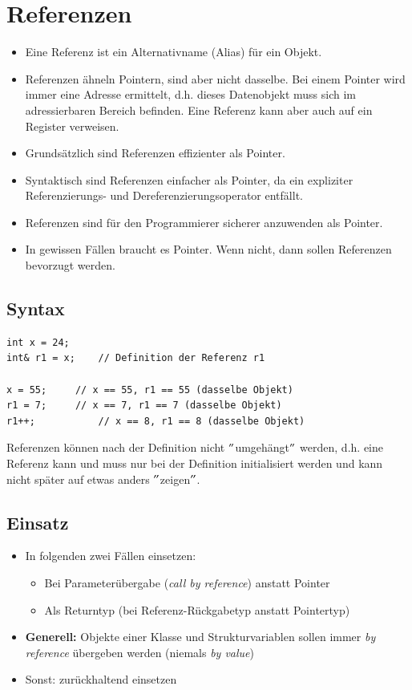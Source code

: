 \section{Referenzen}
\begin{itemize}
	\item Eine Referenz ist ein Alternativname (Alias) für ein Objekt.
	\item Referenzen ähneln Pointern, sind aber nicht dasselbe. Bei einem Pointer wird immer eine Adresse ermittelt, d.h. dieses Datenobjekt muss sich im adressierbaren Bereich befinden. Eine Referenz kann aber auch auf ein Register verweisen.
	\item Grundsätzlich sind Referenzen effizienter als Pointer.
	\item Syntaktisch sind Referenzen einfacher als Pointer, da ein expliziter Referenzierungs- und Dereferenzierungsoperator entfällt.
	\item Referenzen sind für den Programmierer sicherer anzuwenden als Pointer.
	\item In gewissen Fällen braucht es Pointer. Wenn nicht, dann sollen Referenzen bevorzugt werden.
\end{itemize}

\subsection{Syntax}
\noindent
\begin{minipage}{0.65\linewidth}
\begin{lstlisting}
int x = 24;
int& r1 = x;	// Definition der Referenz r1

x = 55;		// x == 55, r1 == 55 (dasselbe Objekt)
r1 = 7;		// x == 7, r1 == 7 (dasselbe Objekt)
r1++;			// x == 8, r1 == 8 (dasselbe Objekt)
\end{lstlisting}
\end{minipage}
\begin{hinweis}
Referenzen können nach der Definition nicht $"$umgehängt$"$ werden, d.h. eine Referenz kann und muss nur bei der Definition initialisiert werden und kann nicht später auf etwas anders $"$zeigen$"$.
\end{hinweis}

\subsection{Einsatz}
\begin{itemize}
	\item In folgenden zwei Fällen einsetzen:
	\begin{itemize}
		\item Bei Parameterübergabe (\emph{call by reference}) anstatt Pointer
		\item Als Returntyp (bei Referenz-Rückgabetyp anstatt Pointertyp)
	\end{itemize}
	\item \textbf{Generell:} Objekte einer Klasse und Strukturvariablen sollen immer \emph{by reference} übergeben werden (niemals \emph{by value})
	\item Sonst: zurückhaltend einsetzen
\end{itemize}

